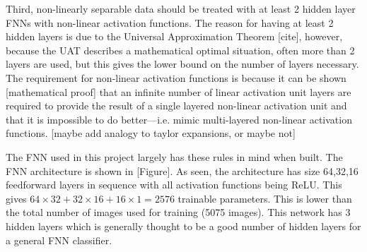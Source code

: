 \documentclass[a4paper,fleqn,usenatbib]{mnras}
\begin{document}
Third, non-linearly separable data should be treated with at least 2 hidden layer FNNs with non-linear activation functions. The reason for having at least 2 hidden layers is due to the Universal Approximation Theorem [cite], however, because the UAT describes a mathematical optimal situation, often more than 2 layers are used, but this gives the lower bound on the number of layers necessary. The requirement for non-linear activation functions is because it can be shown [mathematical proof] that an infinite number of linear activation unit layers are required to provide the result of a single layered non-linear activation unit and that it is impossible to do better---i.e. mimic multi-layered non-linear activation functions. [maybe add analogy to taylor expansions, or maybe not]

The FNN used in this project largely has these rules in mind when built. The FNN architecture is shown in [Figure]. As seen, the architecture has size 64,32,16 feedforward layers in sequence with all activation functions being ReLU. This gives $64\times 32+32\times 16 +16\times 1 = 2576$ trainable parameters. This is lower than the total number of images used for training (5075 images). This network has 3 hidden layers which is generally thought to be a good number of hidden layers for a general FNN classifier. 
\end{document}
